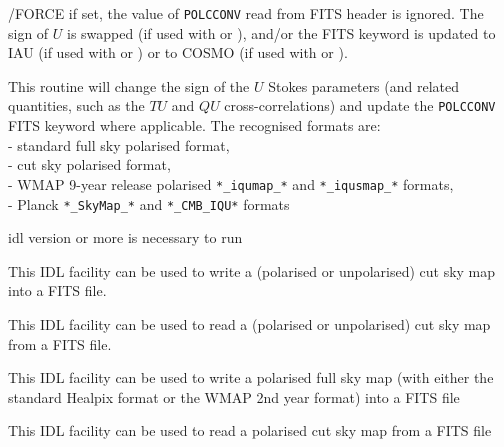 \begin{keywords}
\begin{kwlist}{}
        \item[{/FORCE}]   if set, 
           the value of \texttt{POLCCONV} read from 
	 FITS header is ignored.
              The sign of $U$ is swapped (if used with 
               or 
              ), and/or the 
              FITS keyword is updated to IAU (if used with 
		 or 
		) or to COSMO (if used with 
		 or 
		).

   \end{kwlist}
\end{keywords}

\begin{codedescription}
{This routine will change the sign of the $U$ Stokes parameters (and related
quantities, such as the $TU$ and $QU$ cross-correlations) and update the
\texttt{POLCCONV} FITS keyword where applicable.
The recognised formats are: \\
- standard \healpix full sky polarised format, \\
- cut sky \healpix polarised format, \\
- WMAP 9-year release polarised \texttt{*\_iqumap\_*} and \texttt{*\_iqusmap\_*} formats,\\
- Planck \texttt{*\_SkyMap\_*} and \texttt{*\_CMB\_IQU*} formats}
\end{codedescription}



\begin{related}
  \begin{sulist}{} %
  \item[idl] version \idlversion or more is necessary to run \facname
  \item[\htmlref{write\_fits\_cut4}{idl:write_fits_cut4}] This \healpix IDL
  facility can be used to write a (polarised or unpolarised) cut sky map into a
  FITS file.
  \item[\htmlref{read\_fits\_cut4}{idl:read_fits_cut4}] This \healpix IDL
  facility can be used to read a (polarised or unpolarised) cut sky map from a
  FITS file.
  \item[\htmlref{write\_tqu}{idl:write_tqu}] This \healpix IDL
  facility can be used to write a polarised full sky map (with either the
  standard Healpix format or the WMAP 2nd year format) into a
  FITS file
  \item[\htmlref{read\_tqu}{idl:read_tqu}] This \healpix IDL
  facility can be used to read a polarised cut sky map from a
  FITS file
  \end{sulist}
\end{related}


